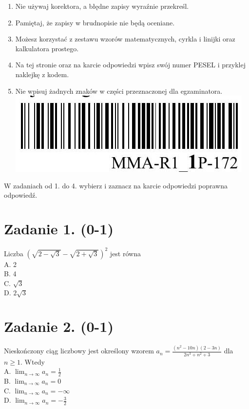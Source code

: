 \documentclass[10pt]{article}
\begin{document}
\begin{enumerate}
  \item Nie używaj korektora, a błędne zapisy wyraźnie przekreśl.
  \item Pamiętaj, że zapisy w brudnopisie nie będą oceniane.
  \item Możesz korzystać z zestawu wzorów matematycznych, cyrkla i linijki oraz kalkulatora prostego.
  \item Na tej stronie oraz na karcie odpowiedzi wpisz swój numer PESEL i przyklej naklejkę z kodem.
  \item Nie wpisuj żadnych znaków w części przeznaczonej dla egzaminatora.\\
\includegraphics[max width=\textwidth, center]{2024_11_21_3120cbc7edd07b3a101fg-01}
\end{enumerate}

W zadaniach od 1. do 4. wybierz i zaznacz na karcie odpowiedzi poprawna odpowiedź.

\section*{Zadanie 1. (0-1)}
Liczba \((\sqrt{2-\sqrt{3}}-\sqrt{2+\sqrt{3}})^{2}\) jest równa\\
A. 2\\
B. 4\\
C. \(\sqrt{3}\)\\
D. \(2 \sqrt{3}\)

\section*{Zadanie 2. (0-1)}
Nieskończony ciąg liczbowy jest określony wzorem \(a_{n}=\frac{\left(n^{2}-10 n\right)(2-3 n)}{2 n^{3}+n^{2}+3}\) dla \(n \geq 1\). Wtedy\\
A. \(\lim _{n \rightarrow \infty} a_{n}=\frac{1}{2}\)\\
B. \(\lim _{n \rightarrow \infty} a_{n}=0\)\\
C. \(\lim _{n \rightarrow \infty} a_{n}=-\infty\)\\
D. \(\lim _{n \rightarrow \infty} a_{n}=-\frac{3}{2}\)
\end{document}
